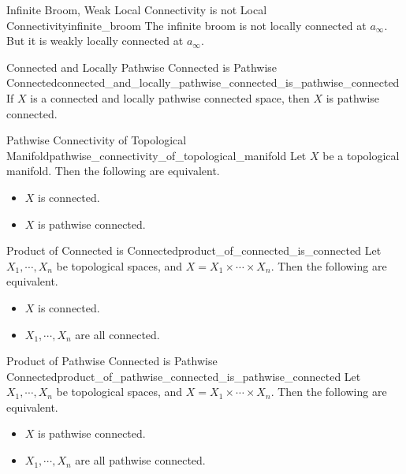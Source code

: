 \documentclass{article}
\begin{document}
\begin{counterexample}{Infinite Broom, Weak Local Connectivity is not Local Connectivity}{infinite_broom}
    The infinite broom is not locally connected at $a_\infty$.
    But it is weakly locally connected at $a_\infty$.
\end{counterexample}

\begin{theorem}{Connected and Locally Pathwise Connected is Pathwise Connected}{connected_and_locally_pathwise_connected_is_pathwise_connected}
    If $X$ is a connected and locally pathwise connected space, then $X$ is pathwise connected.
\end{theorem}

\begin{theorem}{Pathwise Connectivity of Topological Manifold}{pathwise_connectivity_of_topological_manifold}
    Let $X$ be a topological manifold.
    Then the following are equivalent.
    \begin{itemize}
        \item $X$ is connected.
        \item $X$ is pathwise connected.
    \end{itemize}
\end{theorem}

\begin{theorem}{Product of Connected is Connected}{product_of_connected_is_connected}
    Let $X_1,\cdots,X_n$ be topological spaces, and $X = X_1\times \cdots \times X_n$.
    Then the following are equivalent.
    \begin{itemize}
        \item $X$ is connected.
        \item $X_1,\cdots,X_n$ are all connected.
    \end{itemize}
\end{theorem}

\begin{theorem}{Product of Pathwise Connected is Pathwise Connected}{product_of_pathwise_connected_is_pathwise_connected}
    Let $X_1,\cdots,X_n$ be topological spaces, and $X = X_1\times \cdots \times X_n$.
    Then the following are equivalent.
    \begin{itemize}
        \item $X$ is pathwise connected.
        \item $X_1,\cdots,X_n$ are all pathwise connected.
    \end{itemize}
\end{theorem}
\end{document}
